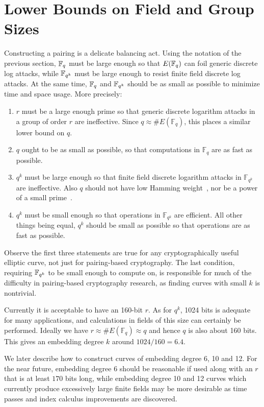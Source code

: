 \section {Lower Bounds on Field and Group Sizes}

Constructing a pairing is a delicate balancing act.
Using the notation of the previous section,
$\mathbb{F}_q$ must be large enough
so that $E(\mathbb{F}_q)$ can foil generic discrete log attacks, while $\mathbb{F}_{q^k}$ must be
large enough to resist finite field discrete log attacks. At the same time,
$\mathbb{F}_q$ and $\mathbb{F}_{q^k}$ should be as small as possible to minimize time and space
usage. More precisely:

\begin{enumerate}
\item
$r$ must be a large enough prime so that generic discrete logarithm attacks
in a group of order $r$ are ineffective. Since $q \approx \#E(\mathbb{F}_q)$,
this places a similar lower bound on $q$.
\item
$q$ ought to be as small as possible, so that computations in $\mathbb{F}_q$
are as fast as possible.
\item
$q^k$ must be large enough so that finite field discrete logarithm attacks
in $\mathbb{F}_{q^k}$ are ineffective. Also
$q$ should not have low Hamming weight~\cite{stinson}, nor be a power of
a small prime~\cite{coppersmith}.
\item
$q^k$ must be small enough so that operations in $\mathbb{F}_{q^k}$
are efficient. All other things being equal,
$q^k$ should be small as possible so that operations
are as fast as possible.
\end{enumerate}

Observe the first three statements are true for any cryptographically
useful elliptic curve, not just for pairing-based cryptography.
The last condition, requiring $\mathbb{F}_{q^k}$ to be small enough to compute on,
is responsible for much of the difficulty in pairing-based cryptography
research, as finding curves with small $k$ is nontrivial.

Currently it is acceptable to have an 160-bit $r$.
As for $q^k$, 1024 bits is adequate for many applications, and calculations
in fields of this size can certainly be performed.
Ideally we have $r \approx \#E(\mathbb{F}_q) \approx q$
and hence $q$ is also about 160 bits. This gives an
embedding degree $k$ around $1024 / 160 = 6.4$.

We later describe how to construct curves of embedding degree 6, 10 and 12.
For the near future, embedding degree 6 should be reasonable if used along
with an $r$ that is at least $170$ bits long,
while embedding degree 10 and 12 curves which currently produce excessively
large finite fields may be more desirable as time passes and index calculus
improvements are discovered.

